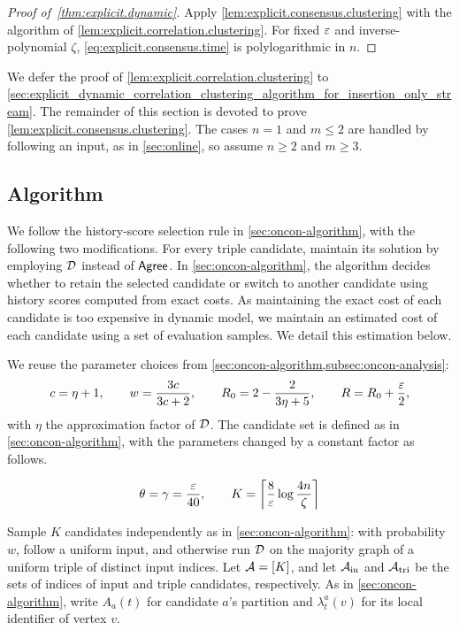 \begin{proof}[Proof of~\cref{thm:explicit.dynamic}]
Apply \cref{lem:explicit.consensus.clustering} with the algorithm of \cref{lem:explicit.correlation.clustering}.
For fixed $ \varepsilon $ and inverse-polynomial $ \zeta $, \eqref{eq:explicit.consensus.time} is polylogarithmic in $ n $.
\end{proof}

We defer the proof of \cref{lem:explicit.correlation.clustering} to \cref{sec:explicit_dynamic_correlation_clustering_algorithm_for_insertion_only_stream}.
The remainder of this section is devoted to prove \cref{lem:explicit.consensus.clustering}.
The cases $ n=1 $ and $ m\le2 $ are handled by following an input, as in \cref{sec:online}, so assume $ n\ge2 $ and $ m\ge3 $.

\subsection{Algorithm}\label{subsec:explicit.consensus.algorithm}

We follow the history-score selection rule in \cref{sec:oncon-algorithm}, with the following two modifications.
For every triple candidate, maintain its solution by employing $ \mathcal D $ instead of $ \mathsf{Agree} $.
In \cref{sec:oncon-algorithm}, the algorithm decides whether to retain the selected candidate or switch to another candidate using history scores computed from exact costs.
As maintaining the exact cost of each candidate is too expensive in dynamic model, we maintain an estimated cost of each candidate using a set of evaluation samples. 
We detail this estimation below.

We reuse the parameter choices from \cref{sec:oncon-algorithm,subsec:oncon-analysis}:
\begin{equation*}
  c=\eta+1,\qquad
  w=\frac{3c}{3c+2},\qquad
  R_0=2-\frac{2}{3\eta+5},\qquad
  R=R_0+\frac{\varepsilon}{2},
\end{equation*}
with $ \eta $ the approximation factor of $ \mathcal D $. 
The candidate set is defined as in \cref{sec:oncon-algorithm}, with the parameters changed by a constant factor as follows.

\begin{align}
    \theta=\gamma=\frac{\varepsilon}{40}, \qquad
    K=\left\lceil\frac{8}{\varepsilon}\log\frac{4n}{\zeta}\right\rceil \label{eq:explicit.dynamic.consensus.K}
\end{align}

Sample $ K $ candidates independently as in \cref{sec:oncon-algorithm}: with probability $ w $, follow a uniform input, and otherwise run $ \mathcal D $ on the majority graph of a uniform triple of distinct input indices.
Let $ \mathcal{A}=[K] $, and let $ \mathcal{A}_{\rm in} $ and $ \mathcal{A}_{\rm tri} $ be the sets of indices of input and triple candidates, respectively. As in \cref{sec:oncon-algorithm}, write $ A_a(t) $ for candidate $ a $'s partition and $ \lambda_t^a(v) $ for its local identifier of vertex $ v $.

